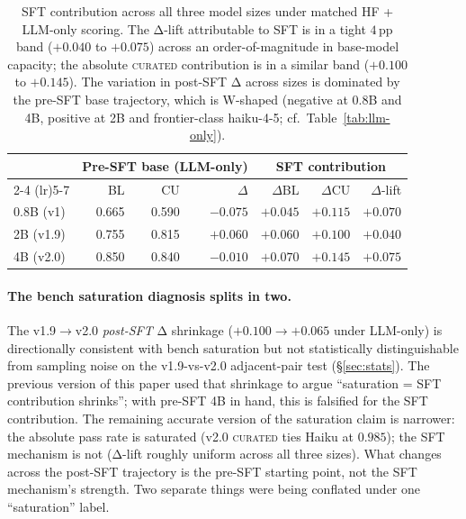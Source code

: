 \documentclass[10pt]{article}
\newcommand{\CU}{\textsc{curated}\xspace}
\begin{document}
\begin{table}[h]
\centering
\small
\begin{tabular}{@{}l rrr rrr@{}}
\toprule
& \multicolumn{3}{c}{\textbf{Pre-SFT base (LLM-only)}} & \multicolumn{3}{c}{\textbf{SFT contribution}} \\
\cmidrule(lr){2-4} \cmidrule(lr){5-7}
& BL & CU & $\Delta$ & $\Delta$BL & $\Delta$CU & $\Delta$-lift \\
\midrule
0.8B (v1)   & 0.665 & 0.590 & $-0.075$ & $+0.045$ & $+0.115$ & $\boldsymbol{+0.070}$ \\
2B (v1.9)   & 0.755 & 0.815 & $+0.060$ & $+0.060$ & $+0.100$ & $\boldsymbol{+0.040}$ \\
4B (v2.0)   & 0.850 & 0.840 & $-0.010$ & $+0.070$ & $+0.145$ & $\boldsymbol{+0.075}$ \\
\bottomrule
\end{tabular}
\caption{SFT contribution across all three model sizes under matched HF + LLM-only scoring. The Δ-lift attributable to SFT is in a tight $4$\,pp band ($+0.040$ to $+0.075$) across an order-of-magnitude in base-model capacity; the absolute \CU{} contribution is in a similar band ($+0.100$ to $+0.145$). The variation in post-SFT Δ across sizes is dominated by the pre-SFT base trajectory, which is W-shaped (negative at 0.8B and 4B, positive at 2B and frontier-class haiku-4-5; cf.\ Table~\ref{tab:llm-only}).}
\label{tab:sft-contribution}
\end{table}

\paragraph{The bench saturation diagnosis splits in two.} The v1.9$\to$v2.0 \emph{post-SFT} Δ shrinkage ($+0.100 \to +0.065$ under LLM-only) is directionally consistent with bench saturation but not statistically distinguishable from sampling noise on the v1.9-vs-v2.0 adjacent-pair test (\S\ref{sec:stats}). The previous version of this paper used that shrinkage to argue ``saturation = SFT contribution shrinks''; with pre-SFT 4B in hand, this is falsified for the SFT contribution. The remaining accurate version of the saturation claim is narrower: the absolute pass rate is saturated (v2.0 \CU{} ties Haiku at $0.985$); the SFT mechanism is not (Δ-lift roughly uniform across all three sizes). What changes across the post-SFT trajectory is the pre-SFT starting point, not the SFT mechanism's strength. Two separate things were being conflated under one ``saturation'' label.
\end{document}
